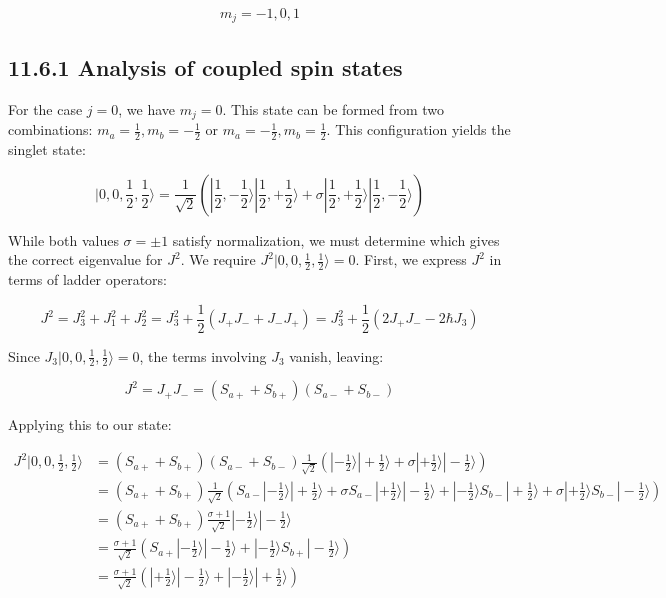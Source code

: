\documentclass[10pt]{article}
\begin{document}
\begin{equation*}
m_{j}=-1,0,1 \tag{11.57}
\end{equation*}


\subsection*{11.6.1 Analysis of coupled spin states}
For the case $j=0$, we have $m_j=0$. This state can be formed from two combinations: $m_a=\frac{1}{2}, m_b=-\frac{1}{2}$ or $m_a=-\frac{1}{2}, m_b=\frac{1}{2}$. This configuration yields the singlet state:

\begin{equation*}
|0,0,\frac{1}{2},\frac{1}{2}\rangle=\frac{1}{\sqrt{2}}(|\frac{1}{2},-\frac{1}{2}\rangle|\frac{1}{2},+\frac{1}{2}\rangle+\sigma|\frac{1}{2},+\frac{1}{2}\rangle|\frac{1}{2},-\frac{1}{2}\rangle) \tag{11.58}
\end{equation*}

While both values $\sigma=\pm 1$ satisfy normalization, we must determine which gives the correct eigenvalue for $J^2$. We require $J^2|0,0,\frac{1}{2},\frac{1}{2}\rangle=0$. First, we express $J^2$ in terms of ladder operators:

\begin{equation*}
J^{2}=J_{3}^{2}+J_{1}^{2}+J_{2}^{2}=J_{3}^{2}+\frac{1}{2}(J_{+}J_{-}+J_{-}J_{+})=J_{3}^{2}+\frac{1}{2}(2J_{+}J_{-}-2\hbar J_{3}) \tag{11.59}
\end{equation*}

Since $J_3|0,0,\frac{1}{2},\frac{1}{2}\rangle=0$, the terms involving $J_3$ vanish, leaving:

\begin{equation*}
J^{2}=J_{+}J_{-}=(S_{a+}+S_{b+})(S_{a-}+S_{b-}) \tag{11.60}
\end{equation*}

Applying this to our state:

\begin{align*}
J^{2}|0,0,\frac{1}{2},\frac{1}{2}\rangle &= (S_{a+}+S_{b+})(S_{a-}+S_{b-}) \frac{1}{\sqrt{2}}(|-\frac{1}{2}\rangle|+\frac{1}{2}\rangle+\sigma|+\frac{1}{2}\rangle|-\frac{1}{2}\rangle) \\
&= (S_{a+}+S_{b+}) \frac{1}{\sqrt{2}}(S_{a-}|-\frac{1}{2}\rangle|+\frac{1}{2}\rangle+\sigma S_{a-}|+\frac{1}{2}\rangle|-\frac{1}{2}\rangle+|-\frac{1}{2}\rangle S_{b-}|+\frac{1}{2}\rangle+\sigma|+\frac{1}{2}\rangle S_{b-}|-\frac{1}{2}\rangle) \\
&= (S_{a+}+S_{b+}) \frac{\sigma+1}{\sqrt{2}}|-\frac{1}{2}\rangle|-\frac{1}{2}\rangle \\
&= \frac{\sigma+1}{\sqrt{2}}(S_{a+}|-\frac{1}{2}\rangle|-\frac{1}{2}\rangle+|-\frac{1}{2}\rangle S_{b+}|-\frac{1}{2}\rangle) \\
&= \frac{\sigma+1}{\sqrt{2}}(|+\frac{1}{2}\rangle|-\frac{1}{2}\rangle+|-\frac{1}{2}\rangle|+\frac{1}{2}\rangle) \tag{11.61}
\end{align*}
\end{document}
